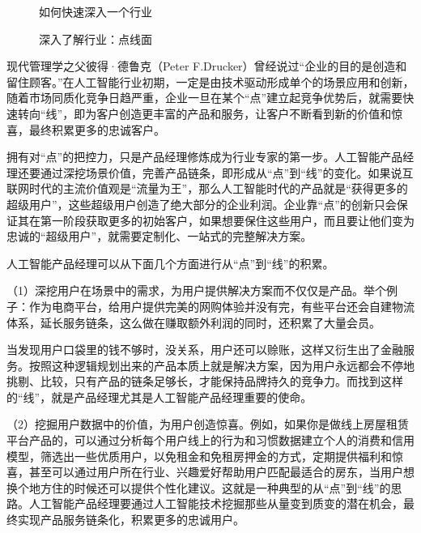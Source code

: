\documentclass[letterpaper,10pt,english]{sphinxmanual}
\begin{document}
\begin{figure}[H]
\centering
\capstart

\noindent{}
\caption{如何快速深入一个行业}\label{\detokenize{chapter_knowledge/industry_analysis:id30}}\end{figure}

\begin{figure}[H]
\centering
\capstart

\noindent{}
\caption{深入了解行业：点线面}\label{\detokenize{chapter_knowledge/industry_analysis:id31}}\end{figure}

现代管理学之父彼得·德鲁克（Peter
F.Drucker）曾经说过“企业的目的是创造和留住顾客。”在人工智能行业初期，一定是由技术驱动形成单个的场景应用和创新，随着市场同质化竞争日趋严重，企业一旦在某个“点”建立起竞争优势后，就需要快速转向“线”，即为客户创造更丰富的产品和服务，让客户不断看到新的价值和惊喜，最终积累更多的忠诚客户。

拥有对“点”的把控力，只是产品经理修炼成为行业专家的第一步。人工智能产品经理还要通过深挖场景价值，完善产品链条，即形成从“点”到“线”的变化。如果说互联网时代的主流价值观是“流量为王”，那么人工智能时代的产品就是“获得更多的超级用户”，这些超级用户创造了绝大部分的企业利润。企业靠“点”的创新只会保证其在第一阶段获取更多的初始客户，如果想要保住这些用户，而且要让他们变为忠诚的“超级用户”，就需要定制化、一站式的完整解决方案。

人工智能产品经理可以从下面几个方面进行从“点”到“线”的积累。

（1）深挖用户在场景中的需求，为用户提供解决方案而不仅仅是产品。举个例子：作为电商平台，给用户提供完美的网购体验并没有完，有些平台还会自建物流体系，延长服务链条，这么做在赚取额外利润的同时，还积累了大量会员。

当发现用户口袋里的钱不够时，没关系，用户还可以赊账，这样又衍生出了金融服务。按照这种逻辑规划出来的产品本质上就是解决方案，因为用户永远都会不停地挑剔、比较，只有产品的链条足够长，才能保持品牌持久的竞争力。而找到这样的“线”，就是产品经理尤其是人工智能产品经理重要的使命。

（2）挖掘用户数据中的价值，为用户创造惊喜。例如，如果你是做线上房屋租赁平台产品的，可以通过分析每个用户线上的行为和习惯数据建立个人的消费和信用模型，筛选出一些优质用户，以免租金和免租房押金的方式，定期提供福利和惊喜，甚至可以通过用户所在行业、兴趣爱好帮助用户匹配最适合的房东，当用户想换个地方住的时候还可以提供个性化建议。这就是一种典型的从“点”到“线”的思路。人工智能产品经理要通过人工智能技术挖掘那些从量变到质变的潜在机会，最终实现产品服务链条化，积累更多的忠诚用户。
\end{document}
